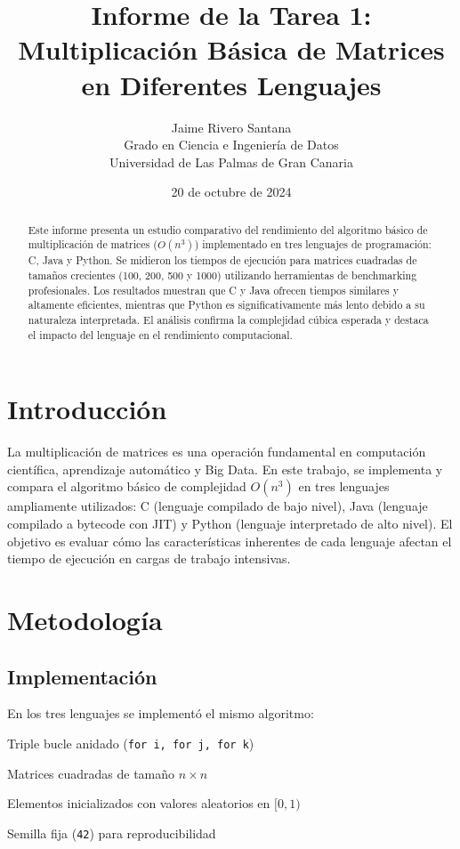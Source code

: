 \documentclass[12pt]{article}
\title{Informe de la Tarea 1: Multiplicación Básica de Matrices en Diferentes Lenguajes}
\author{Jaime Rivero Santana  \\ Grado en Ciencia e Ingeniería de Datos \\ Universidad de Las Palmas de Gran Canaria}
\date{20 de octubre de 2024}
\begin{document}
\maketitle

\begin{abstract}
Este informe presenta un estudio comparativo del rendimiento del algoritmo básico de multiplicación de matrices (\(O(n^3)\)) implementado en tres lenguajes de programación: C, Java y Python. Se midieron los tiempos de ejecución para matrices cuadradas de tamaños crecientes (100, 200, 500 y 1000) utilizando herramientas de benchmarking profesionales. Los resultados muestran que C y Java ofrecen tiempos similares y altamente eficientes, mientras que Python es significativamente más lento debido a su naturaleza interpretada. El análisis confirma la complejidad cúbica esperada y destaca el impacto del lenguaje en el rendimiento computacional.
\end{abstract}

\section{Introducción}
La multiplicación de matrices es una operación fundamental en computación científica, aprendizaje automático y Big Data. En este trabajo, se implementa y compara el algoritmo básico de complejidad \(O(n^3)\) en tres lenguajes ampliamente utilizados: C (lenguaje compilado de bajo nivel), Java (lenguaje compilado a bytecode con JIT) y Python (lenguaje interpretado de alto nivel). El objetivo es evaluar cómo las características inherentes de cada lenguaje afectan el tiempo de ejecución en cargas de trabajo intensivas.

\section{Metodología}
\subsection{Implementación}
En los tres lenguajes se implementó el mismo algoritmo:
\item Triple bucle anidado (\texttt{for i, for j, for k})
    \item Matrices cuadradas de tamaño \(n \times n\)
    \item Elementos inicializados con valores aleatorios en \([0, 1)\)
    \item Semilla fija (\texttt{42}) para reproducibilidad
\end{document}

